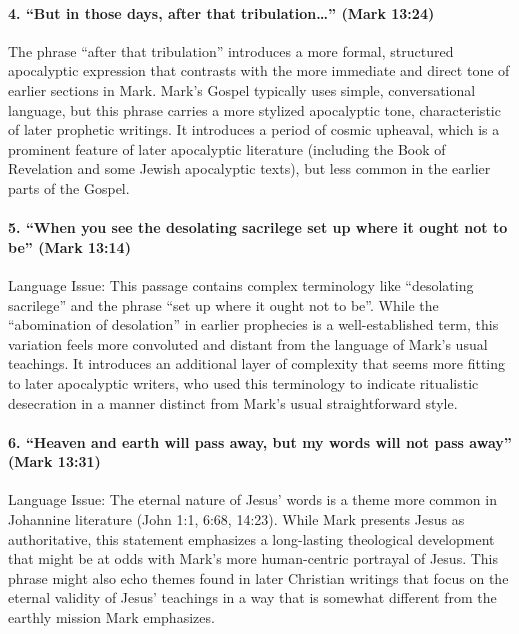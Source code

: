 \paragraph{\texorpdfstring{4.
``But in those days, after that tribulation\ldots{}'' (Mark 13:24)}{4.
``But in those days, after that tribulation\ldots'' (Mark 13:24)}}\label{par:but-in-those-days-after-that-tribulation-mark-1324}

The phrase ``after that tribulation'' introduces a more formal, structured apocalyptic expression that contrasts with the more immediate and direct tone of earlier sections in Mark.
Mark's Gospel typically uses simple, conversational language, but this phrase carries a more stylized apocalyptic tone, characteristic of later prophetic writings.
It introduces a period of cosmic upheaval, which is a prominent feature of later apocalyptic literature (including the Book of Revelation and some Jewish apocalyptic texts), but less common in the earlier parts of the Gospel.

\paragraph{5.
``When you see the desolating sacrilege set up where it ought not to be'' (Mark 13:14)}\label{par:when-you-see-the-desolating-sacrilege-set-up-where-it-ought-not-to-be-mark-1314}

Language Issue: This passage contains complex terminology like ``desolating sacrilege'' and the phrase ``set up where it ought not to be''.
While the ``abomination of desolation'' in earlier prophecies is a well-established term, this variation feels more convoluted and distant from the language of Mark's usual teachings.
It introduces an additional layer of complexity that seems more fitting to later apocalyptic writers, who used this terminology to indicate ritualistic desecration in a manner distinct from Mark's usual straightforward style.

\paragraph{6.
``Heaven and earth will pass away, but my words will not pass away'' (Mark 13:31)}\label{par:heaven-and-earth-will-pass-away-but-my-words-will-not-pass-away-mark-1331}

Language Issue: The eternal nature of Jesus' words is a theme more common in Johannine literature (John 1:1, 6:68, 14:23).
While Mark presents Jesus as authoritative, this statement emphasizes a long-lasting theological development that might be at odds with Mark's more human-centric portrayal of Jesus.
This phrase might also echo themes found in later Christian writings that focus on the eternal validity of Jesus' teachings in a way that is somewhat different from the earthly mission Mark emphasizes.

